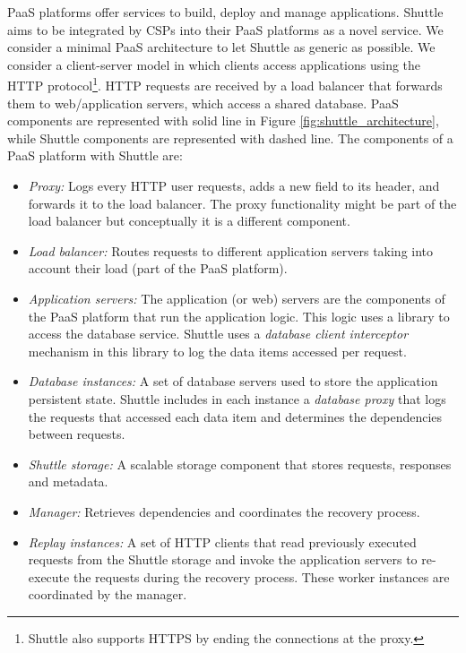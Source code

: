 \ac{PaaS} platforms offer services to build, deploy and manage applications. Shuttle aims to be integrated by CSPs into their \ac{PaaS} platforms as a novel service. 
We consider a minimal \ac{PaaS} architecture to let Shuttle as generic as possible. We consider a client-server model in which clients access applications using the HTTP protocol\footnote{Shuttle also supports HTTPS by ending the connections at the proxy.}. HTTP requests are received by a load balancer that forwards them to web/application servers, which access a shared database. {PaaS} components are represented with solid line in Figure \ref{fig:shuttle_architecture}, while Shuttle components are represented with dashed line. The components of a \ac{PaaS} platform with Shuttle are:

\begin{itemize}
  \item \textit{Proxy:} Logs every HTTP user requests, adds a new field to its header, and forwards it to the load balancer. The proxy functionality might be part of the load balancer but conceptually it is a different component.%
  \item \textit{Load balancer:} Routes requests to different application servers taking into account their load (part of the \ac{PaaS} platform).
  \item \textit{Application servers:} The application (or web) servers are the components of the \ac{PaaS} platform that run the application logic. This logic uses a library to access the database service. Shuttle uses a \textit{database client interceptor} mechanism in this library to log the data items accessed per request.
  \item \textit{Database instances:} A set of database servers used to store the application persistent state. Shuttle includes in each instance  a \textit{database proxy} that logs the requests that accessed each data item and determines the dependencies between requests.
  \item \textit{Shuttle storage:} A scalable storage component that stores requests, responses and metadata.
  \item \textit{Manager:} Retrieves dependencies and coordinates the recovery process. 
  \item \textit{Replay instances:} A set of HTTP clients that read previously executed requests from the Shuttle storage and invoke the application servers to re-execute the requests during the recovery process. These worker instances are coordinated by the manager.
\end{itemize}

